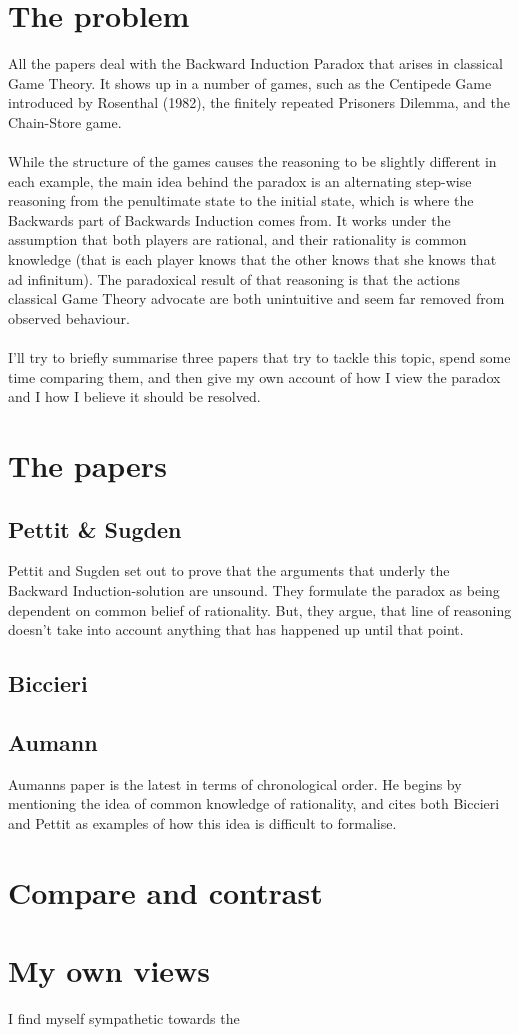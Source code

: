 \documentclass{article}
\begin{document}
\section{The problem}
All the papers deal with the Backward Induction Paradox that arises in classical Game Theory. It shows up in a number of games, such as the Centipede Game introduced by Rosenthal (1982), the finitely repeated Prisoners Dilemma, and the Chain-Store game.
\\
\\
While the structure of the games causes the reasoning to be slightly different in each example, the main idea behind the paradox is an alternating step-wise reasoning from the penultimate state to the initial state, which is where the Backwards part of Backwards Induction comes from. It works under the assumption that both players are rational, and their rationality is common knowledge %
(that is each player knows that the other knows that she knows that ad infinitum). The paradoxical result of that reasoning is that the actions classical Game Theory advocate are both unintuitive and seem far removed from observed behaviour.
\\
\\
I'll try to briefly summarise three papers that try to tackle this topic, spend some time comparing them, and then give my own account of how I view the paradox and I how I believe it should be resolved. 

\section{The papers}
\subsection{Pettit \& Sugden}
Pettit and Sugden set out to prove that the arguments that underly the Backward Induction-solution are unsound. They formulate the paradox as being dependent on common belief of rationality. 
But, they argue, that line of reasoning doesn't take into account anything that has happened up until that point.



\subsection{Biccieri}
\subsection{Aumann}
Aumanns paper is the latest in terms of chronological order. He begins by mentioning the idea of common knowledge of rationality, and cites both Biccieri and Pettit as examples of how this idea is difficult to formalise.

\section{Compare and contrast}

\section{My own views}
I find myself sympathetic towards the
\end{document}
